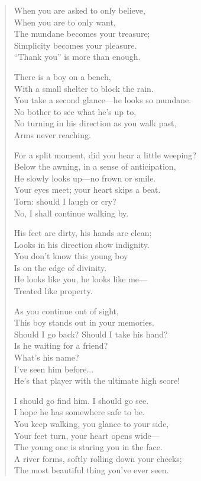 \documentclass[11pt, letterpaper]{article}
\begin{document}
\begin{verse}
When you are asked to only believe,\\
When you are to only want,\\
The mundane becomes your treasure;\\
Simplicity becomes your pleasure.\\
``Thank you'' is more than enough.

There is a boy on a bench,\\
With a small shelter to block the rain.\\
You take a second glance---he looks so mundane.\\
No bother to see what he’s up to,\\
No turning in his direction as you walk past,\\
Arms never reaching.

For a split moment, did you hear a little weeping?\\
Below the awning, in a sense of anticipation,\\
He slowly looks up---no frown or smile.\\
Your eyes meet; your heart skips a beat.\\
Torn: should I laugh or cry?\\
No, I shall continue walking by.

His feet are dirty, his hands are clean;\\
Looks in his direction show indignity.\\
You don’t know this young boy\\
Is on the edge of divinity.\\
He looks like you, he looks like me---\\
Treated like property.

As you continue out of sight,\\
This boy stands out in your memories.\\
Should I go back? Should I take his hand?\\
Is he waiting for a friend?\\
What’s his name?\\
I’ve seen him before...\\
He’s that player with the ultimate high score!

I should go find him. I should go see.\\
I hope he has somewhere safe to be.\\
You keep walking, you glance to your side,\\
Your feet turn, your heart opens wide---\\
The young one is staring you in the face.\\
A river forms, softly rolling down your cheeks;\\
The most beautiful thing you’ve ever seen.


\end{verse}
\end{document}
